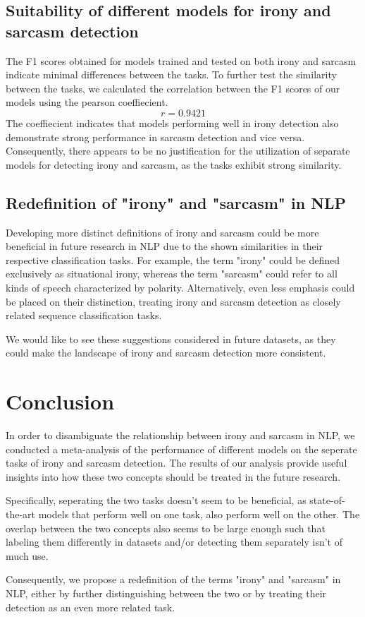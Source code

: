 \documentclass[10pt, a4paper]{article}
\begin{document}
\subsection{Suitability of different models for irony and sarcasm detection}
The F1 scores obtained for models trained and tested on both irony and sarcasm indicate minimal differences between the tasks.
To further test the similarity between the tasks, we calculated the correlation between the F1 scores of our models using the pearson coeffiecient.
$$
r = 0.9421
$$
The coeffiecient indicates that models performing well in irony detection also demonstrate strong performance in sarcasm detection and vice versa. 
Consequently, there appears to be no justification for the utilization of separate models for detecting irony and sarcasm, as the tasks exhibit strong
similarity.
\subsection{Redefinition of "irony" and "sarcasm" in NLP}
Developing more distinct definitions of irony and sarcasm could be more beneficial in future research in NLP due to the shown 
similarities in their respective classification tasks. For example, the term "irony" could be 
defined exclusively as situational irony, whereas the term "sarcasm" could refer to all kinds of speech characterized by polarity.
Alternatively, even less emphasis could be placed on their distinction, treating irony and sarcasm detection
as closely related sequence classification tasks.

We would like to see these suggestions considered in future datasets, as they could make the landscape of irony and sarcasm detection more consistent.
\section{Conclusion}
In order to disambiguate the relationship between irony and sarcasm in NLP, we conducted a meta-analysis of the performance of different models on the 
seperate tasks of irony and sarcasm detection. The results of our analysis provide useful insights into how these two concepts should be treated in the
future research.

Specifically, seperating the two tasks doesn't seem to be beneficial, as state-of-the-art models that perform well on one task, also perform
well on the other. The overlap between the two concepts also seems to be large enough such that labeling them differently in datasets and/or 
detecting them separately isn't of much use.

Consequently, we propose a redefinition of the terms "irony" and "sarcasm" in NLP, either by further distinguishing between the two or by treating
their detection as an even more related task.

 
\end{document}
